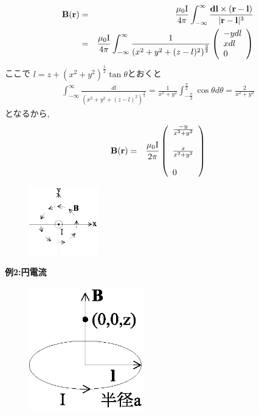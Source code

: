 \documentclass{jsarticle}
\begin{document}
\begin{eqnarray*}
{\bf B}({\bf r})&=&\frac{\mu_0 {\rm I}}{4 \pi} \int_{- \infty}^{\infty}\frac{{\bf dl} \times ({\bf r}-{\bf l})}{|{\bf r}-{\bf l}|^3} \\
&=& \frac{\mu_0 {\rm I}}{4 \pi} \int_{- \infty}^{\infty}\frac{1}{\left( x^2+y^2+(z-l)^2 \right)^{\frac{3}{2}}}
\left(
\begin{array}{l}
-ydl \\
xdl \\
0
\end{array}
\right)
\end{eqnarray*}
ここで $l=z+(x^2+y^2)^{\frac{1}{2}}\tan\theta$とおくと
\begin{eqnarray*}
\int_{- \infty}^{\infty}\frac{dl}{\left( x^2+y^2+(z-l)^2 \right)^{\frac{3}{2}}} = \frac{1}{x^2+y^2} \int_{- \frac{\pi}{2}}^{\frac{\pi}{2}} \cos\theta d\theta = \frac{2}{x^2+y^2}
\end{eqnarray*}
となるから,
\begin{eqnarray*}
{\bf B}({\bf r})&=&\frac{\mu_0 {\rm I}}{2 \pi}
\left(
\begin{array}{l}
\frac{-y}{x^2+y^2} \\
\\
\frac{x}{x^2+y^2} \\
\\
0
\end{array}
\right)
\end{eqnarray*}
\begin{figure}[h]
 \begin{center}
  \includegraphics[width=30mm]{8.3.eps}
 \end{center}
 \caption{}
 \label{fig:three}
\end{figure}
\newpage
{\bf 例2:円電流} \\
\begin{figure}[htbp]
 \begin{center}
  \includegraphics[width=50mm]{8.4.eps}
 \end{center}
 \caption{}
 \label{fig:four}
\end{figure}
\end{document}
